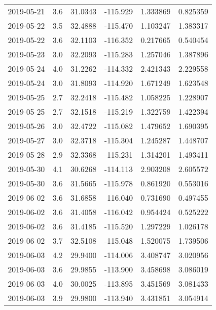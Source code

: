 \begin{tabular}{lrrrrr}
2019-05-21 &       3.6 &  31.0343 &  -115.929 &         1.333869 &         0.825359 \\
2019-05-22 &       3.5 &  32.4888 &  -115.470 &         1.103247 &         1.383317 \\
2019-05-22 &       3.6 &  32.1103 &  -116.352 &         0.217665 &         0.540454 \\
2019-05-23 &       3.0 &  32.2093 &  -115.283 &         1.257046 &         1.387896 \\
2019-05-24 &       4.0 &  31.2262 &  -114.332 &         2.421343 &         2.229558 \\
2019-05-24 &       3.0 &  31.8093 &  -114.920 &         1.671249 &         1.623548 \\
2019-05-25 &       2.7 &  32.2418 &  -115.482 &         1.058225 &         1.228907 \\
2019-05-25 &       2.7 &  32.1518 &  -115.219 &         1.322759 &         1.422394 \\
2019-05-26 &       3.0 &  32.4722 &  -115.082 &         1.479652 &         1.690395 \\
2019-05-27 &       3.0 &  32.3718 &  -115.304 &         1.245287 &         1.448707 \\
2019-05-28 &       2.9 &  32.3368 &  -115.231 &         1.314201 &         1.493411 \\
2019-05-30 &       4.1 &  30.6268 &  -114.113 &         2.903208 &         2.605572 \\
2019-05-30 &       3.6 &  31.5665 &  -115.978 &         0.861920 &         0.553016 \\
2019-06-02 &       3.6 &  31.6858 &  -116.040 &         0.731690 &         0.497455 \\
2019-06-02 &       3.6 &  31.4058 &  -116.042 &         0.954424 &         0.525222 \\
2019-06-02 &       3.6 &  31.4185 &  -115.520 &         1.297229 &         1.026178 \\
2019-06-02 &       3.7 &  32.5108 &  -115.048 &         1.520075 &         1.739506 \\
2019-06-03 &       4.2 &  29.9400 &  -114.006 &         3.408747 &         3.020956 \\
2019-06-03 &       3.6 &  29.9855 &  -113.900 &         3.458698 &         3.086019 \\
2019-06-03 &       4.0 &  30.0025 &  -113.895 &         3.451569 &         3.081433 \\
2019-06-03 &       3.9 &  29.9800 &  -113.940 &         3.431851 &         3.054914 \\

\end{tabular}
